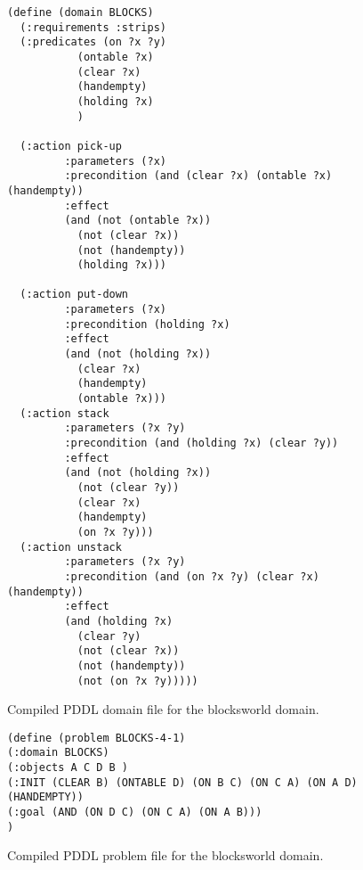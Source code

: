 \begin{figure}[hbtp!]
\begin{scriptsize}  
\begin{verbatim}
(define (domain BLOCKS)
  (:requirements :strips)
  (:predicates (on ?x ?y)
	       (ontable ?x)
	       (clear ?x)
	       (handempty)
	       (holding ?x)
	       )

  (:action pick-up
	     :parameters (?x)
	     :precondition (and (clear ?x) (ontable ?x) (handempty))
	     :effect
	     (and (not (ontable ?x))
		   (not (clear ?x))
		   (not (handempty))
		   (holding ?x)))

  (:action put-down
	     :parameters (?x)
	     :precondition (holding ?x)
	     :effect
	     (and (not (holding ?x))
		   (clear ?x)
		   (handempty)
		   (ontable ?x)))
  (:action stack
	     :parameters (?x ?y)
	     :precondition (and (holding ?x) (clear ?y))
	     :effect
	     (and (not (holding ?x))
		   (not (clear ?y))
		   (clear ?x)
		   (handempty)
		   (on ?x ?y)))
  (:action unstack
	     :parameters (?x ?y)
	     :precondition (and (on ?x ?y) (clear ?x) (handempty))
	     :effect
	     (and (holding ?x)
		   (clear ?y)
		   (not (clear ?x))
		   (not (handempty))
		   (not (on ?x ?y)))))

  \end{verbatim}
\end{scriptsize}  
\caption{\small Compiled PDDL domain file for the blocksworld domain.}
\label{fig:compiled-domain}
\end{figure}


\begin{figure}[hbtp!]
\begin{scriptsize}  
  \begin{verbatim}
(define (problem BLOCKS-4-1)
(:domain BLOCKS)
(:objects A C D B )
(:INIT (CLEAR B) (ONTABLE D) (ON B C) (ON C A) (ON A D) (HANDEMPTY))
(:goal (AND (ON D C) (ON C A) (ON A B)))
)
  \end{verbatim}
\end{scriptsize}  
\caption{\small Compiled PDDL problem file for the blocksworld domain.}
\label{fig:compiled-problem}
\end{figure}
